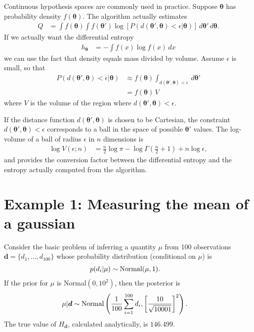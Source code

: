 \documentclass[entropy,article,accept,oneauthor,pdftex,10pt,a4paper]{mdpi}
\renewcommand{\d}{\boldsymbol{d}}
\newcommand{\x}{\boldsymbol{\theta}}
\begin{document}
Continuous hypothesis spaces are commonly used in practice. Suppose
$\x$ has probability density $f(\x)$. The algorithm actually estimates
\begin{align}
Q &= \int f(\x) \int f(\x')
            \log \left[ P(d(\x', \x) < \epsilon | \x) \right]
                        \, d\x' \, d\x.
\end{align}
If we actually want the differential
entropy
\begin{align}
h_{\x} &= -\int f(x) \log f(x) \, dx
\end{align}
we can use the fact that density equals mass divided
by volume. Assume $\epsilon$ is small, so that
\begin{align}
P(d(\x', \x) < \epsilon | \x)
    &\approx
    f(\x) \int_{d(\x', \x) < \epsilon} \, d\x'\\
    &= f(\x) \, V
\end{align}
where $V$ is the volume of the region where $d(\x', \x) < \epsilon$.

If the distance function $d(\x', \x)$ is chosen to be Cartesian,
the constraint $d(\x', \x) < \epsilon$ corresponds to a ball in the space
of possible $\x'$ values.
The log-volume of a ball of radius $\epsilon$ in $n$ dimensions is
\begin{align}
\log V(\epsilon; n) &= \frac{n}{2}\log \pi
                        - \log \Gamma\left(\frac{n}{2} + 1\right)
                        + n \log \epsilon,
\end{align}
and provides the conversion factor between the differential entropy and
the entropy actually computed from the algorithm.


\section{Example 1: Measuring the mean of a gaussian}

Consider the basic problem of inferring a quantity $\mu$ from
100 observations $\d = \{d_1, ..., d_{100}\}$ whose
probability distribution (conditional on $\mu$) is
\begin{align}
p(d_i | \mu) &\sim \textnormal{Normal}(\mu, 1).
\end{align}
If the prior for $\mu$ is Normal$(0, 10^2)$, then the posterior is
\begin{align}
\mu | \d &\sim \textnormal{Normal}\left(
                                       \frac{1}{100}\sum_{i=1}^{100} d_i,
                                       \left[\frac{10}{\sqrt{10001}}\right]^2
                                       \right).
\end{align}
The true value of $H_{\d}$, calculated analytically, is $146.499$.
\end{document}
